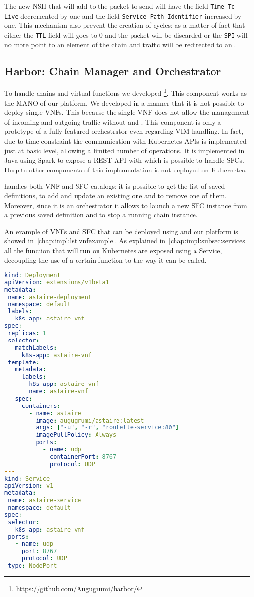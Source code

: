 The new NSH that \astaire{} will add to the packet to send will have the field
\texttt{Time To Live} decremented by one and the field \texttt{Service Path
Identifier} increased by one. This mechanism also prevent the creation of
cycles: as a matter of fact that either the \texttt{TTL} field will goes to $0$
and the packet will be discarded or the \texttt{SPI} will no more point to an
element of the chain and traffic will be redirected to an \egress{}.



\subsection{Harbor: Chain Manager and Orchestrator}
To handle chains and virtual functions we developed
\harbor{}\footnote{\url{https://github.com/Augugrumi/harbor/}}. This component
works as the MANO of our platform. We developed \harbor{} in a manner that it
is not possible to deploy single VNFs. This because the single VNF does not
allow the management of incoming and outgoing traffic without \ingresses{} and
\egresses{}. This component is only a prototype of a fully featured orchestrator
even regarding VIM handling. In fact, due to time constraint the communication
with Kubernetes APIs is implemented just at basic level, allowing a limited
number of operations. It is implemented in Java using Spark to expose a REST API
with which is possible to handle SFCs. Despite other components of this
implementation \harbor{} is not deployed on Kubernetes.

\harbor{} handles both VNF and SFC catalogs: it is possible to get the list of
saved definitions, to add and update an existing one and to remove one of them.
Moreover, since it is an orchestrator it allows to launch a new SFC instance
from a previous saved definition and to stop a running chain instance.

An example of VNFs and SFC that can be deployed using \harbor{} and our platform
is showed in~\ref{chap:impl:lst:vnfexample}. As explained 
in~\ref{chap:impl:subsec:services} all the function that will run on Kubernetes
are exposed using a Service, decoupling the use of a certain function to the way
it can be called.
\begin{lstlisting}[caption={Example of VNF definition}, captionpos=b,
                   language=yaml, label=chap:impl:lst:vnfexample]
kind: Deployment
apiVersion: extensions/v1beta1
metadata:
 name: astaire-deployment
 namespace: default
 labels:
   k8s-app: astaire-vnf
spec:
 replicas: 1
 selector:
   matchLabels:
     k8s-app: astaire-vnf
 template:
   metadata:
     labels:
       k8s-app: astaire-vnf
       name: astaire-vnf
   spec:
     containers:
       - name: astaire
         image: augugrumi/astaire:latest
         args: ["-u", "-r", "roulette-service:80"]
         imagePullPolicy: Always
         ports:
           - name: udp
             containerPort: 8767
             protocol: UDP
---
kind: Service
apiVersion: v1
metadata:
 name: astaire-service
 namespace: default
spec:
 selector:
   k8s-app: astaire-vnf
 ports:
   - name: udp
     port: 8767
     protocol: UDP
 type: NodePort
\end{lstlisting}


